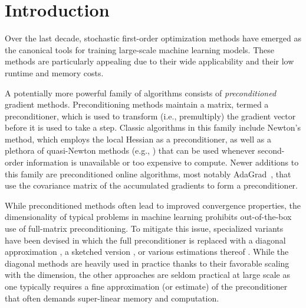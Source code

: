 \section{Introduction}

Over the last decade, stochastic first-order optimization methods have emerged
as the canonical tools for training large-scale machine learning models.
These methods are particularly appealing due to their wide applicability and
their low runtime and memory costs.

A potentially more powerful family of algorithms consists of
\emph{preconditioned} gradient methods.  Preconditioning methods maintain a matrix,
termed a preconditioner, which is used to transform (i.e., premultiply) the
gradient vector before it is used to take a step.  Classic algorithms in this
family include Newton's method, which employs the local Hessian as a
preconditioner, as well as a plethora of quasi-Newton methods (e.g.,
\cite{fletcher2013practical,lewis2013nonsmooth,nocedal1980updating}) that
can be used whenever second-order information is unavailable or too expensive
to compute.  Newer additions to this family are preconditioned online
algorithms, most notably AdaGrad~\citep{duchi2011adaptive}, that use the
covariance matrix of the accumulated gradients to form a preconditioner.

While preconditioned methods often lead to improved convergence properties,
the dimensionality of typical problems in machine learning prohibits
out-of-the-box use of full-matrix preconditioning.  To mitigate this issue,
specialized variants have been devised in which the full preconditioner is replaced
with a diagonal approximation \citep{duchi2011adaptive, kingma2014adam}, a
sketched version \citep{gonen2015faster, pilanci2017newton}, or various
estimations thereof \citep{erdogdu2015convergence, agarwal2016second,
xu2016sub}. While the diagonal methods are heavily used in practice thanks to
their favorable scaling with the dimension, the other approaches are seldom
practical at large scale as one typically requires a fine approximation (or estimate) of the preconditioner that often demands super-linear memory and computation.

